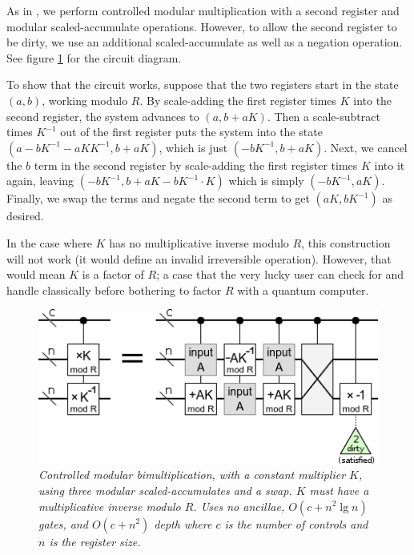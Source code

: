 \documentclass[twocolumn]{article}
\begin{document}
As in \cite{beauregard2003}, we perform controlled modular multiplication with a second register and modular scaled-accumulate operations.
However, to allow the second register to be dirty, we use an additional scaled-accumulate as well as a negation operation.
See figure \ref{fig:controlled-modular-multiply} for the circuit diagram.

To show that the circuit works, suppose that the two registers start in the state $(a, b)$, working modulo $R$.
By scale-adding the first register times $K$ into the second register, the system advances to $(a, b+aK)$.
Then a scale-subtract times $K^{-1}$ out of the first register puts the system into the state $(a-bK^{-1}-aKK^{-1}, b+aK)$, which is just $(-bK^{-1}, b+aK)$.
Next, we cancel the $b$ term in the second register by scale-adding the first register times $K$ into it again, leaving $(-bK^{-1}, b+aK-bK^{-1} \cdot K)$ which is simply $(-bK^{-1}, aK)$.
Finally, we swap the terms and negate the second term to get $(aK, bK^{-1})$ as desired.

In the case where $K$ has no multiplicative inverse modulo $R$, this construction will not work (it would define an invalid irreversible operation).
However, that would mean $K$ is a factor of $R$; a case that the very lucky user can check for and handle classically before bothering to factor $R$ with a quantum computer.

\begin{figure}
  \centering
  \includegraphics[width=\linewidth]{assets/controlled-modular-multiply.png}
  \caption{\em
    Controlled modular bimultiplication, with a constant multiplier $K$, using three modular scaled-accumulates and a swap.
    $K$ must have a multiplicative inverse modulo $R$.
    Uses no ancillae, $O(c + n^2 \lg n)$ gates, and $O(c + n^2)$ depth where $c$ is the number of controls and $n$ is the register size.
  }
  \label{fig:controlled-modular-multiply}
\end{figure}
\end{document}

